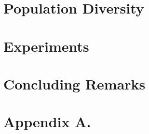 \documentclass{article} %
\begin{document}
\section{Population Diversity}
\label{sec:popular-diversity}




\section{Experiments}
\label{sec:experiments}




\section{Concluding Remarks}
\label{sec:conclusions}




\newpage

\appendix
\section*{Appendix A.}




\end{document}
